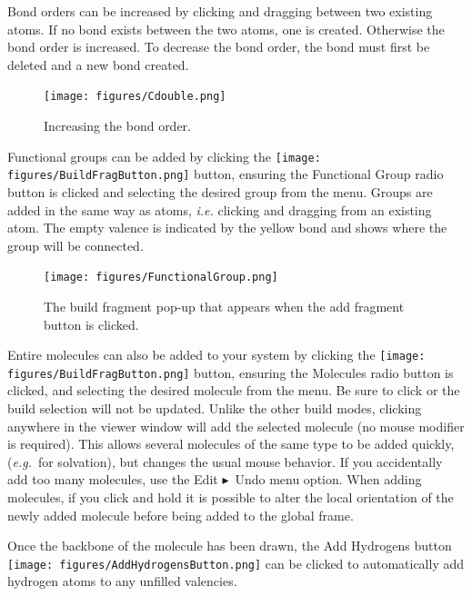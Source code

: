 \documentclass[a4paper,12pt]{article}
\newcommand{\bt}{\ensuremath{\blacktriangleright}}
\newcommand{\eg}{\emph{e.g.}}
\begin{document}
Bond orders can be increased by clicking and dragging between two existing
atoms.  If no bond exists between the two atoms,  one is created.  Otherwise
the bond order is increased.  To decrease the bond order, the bond must first
be deleted and a new bond created.
\begin{figure}[h]
\begin{center}
\texttt{[image: figures/Cdouble.png]}
\caption{Increasing the bond order.}
\end{center}
\end{figure}


Functional groups can be added by clicking the
\texttt{[image: figures/BuildFragButton.png]} button, ensuring the
Functional Group radio button is clicked and selecting the desired group from
the menu.  Groups are added in the same way as atoms, \emph{i.e.} clicking and
dragging from an existing atom.  The empty valence is indicated by the yellow
bond and shows where the group will be connected.
\begin{figure}
\begin{center}
\texttt{[image: figures/FunctionalGroup.png]}
\caption{The build fragment pop-up that appears when the add fragment button
is clicked.} 
\end{center}
\end{figure}


Entire molecules can also be added to your system by clicking the
\texttt{[image: figures/BuildFragButton.png]} button, ensuring the
Molecules radio button is clicked, and selecting the desired molecule from the
menu.  Be sure to click  or the build selection will not be
updated.  Unlike the other build modes, clicking anywhere in the viewer window
will add the selected molecule (no mouse modifier is required).  This allows
several molecules of the same type to be added quickly, (\eg\ for
solvation), but changes the usual mouse behavior.  If you accidentally add too
many molecules, use the Edit \bt\ Undo menu option.  When adding molecules, if
you click and hold it is possible to alter the local orientation of the newly
added molecule before being added to the global frame.

Once the backbone of the molecule has been drawn, the Add Hydrogens button
\texttt{[image: figures/AddHydrogensButton.png]} can be clicked to
automatically add hydrogen atoms to any unfilled valencies.
\end{document}
